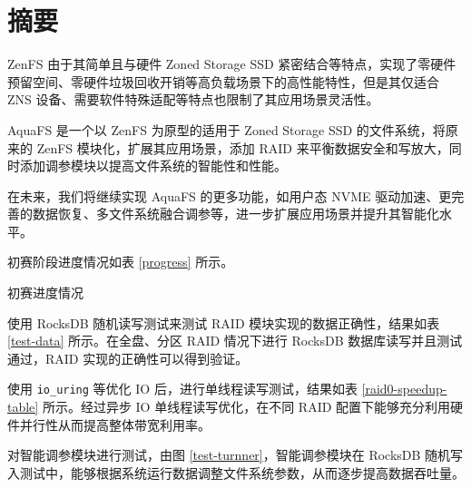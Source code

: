 \section*{摘要}

ZenFS 由于其简单且与硬件 Zoned Storage SSD 紧密结合等特点，实现了零硬件预留空间、零硬件垃圾回收开销等高负载场景下的高性能特性，但是其仅适合 ZNS 设备、需要软件特殊适配等特点也限制了其应用场景灵活性。

AquaFS 是一个以 ZenFS 为原型的适用于 Zoned Storage SSD 的文件系统，将原来的 ZenFS 模块化，扩展其应用场景，添加 RAID 来平衡数据安全和写放大，同时添加调参模块以提高文件系统的智能性和性能。

在未来，我们将继续实现 AquaFS 的更多功能，如用户态 NVME 驱动加速、更完善的数据恢复、多文件系统融合调参等，进一步扩展应用场景并提升其智能化水平。

初赛阶段进度情况如表 \ref{progress} 所示。

\begin{table}[htbp]
  \centering
  \caption{初赛进度情况}
  \label{progress}
  
\end{table}

使用 RocksDB 随机读写测试来测试 RAID 模块实现的数据正确性，结果如表 \ref{test-data} 所示。在全盘、分区 RAID 情况下进行 RocksDB 数据库读写并且测试通过，RAID 实现的正确性可以得到验证。

使用 \verb|io_uring| 等优化 IO 后，进行单线程读写测试，结果如表 \ref{raid0-speedup-table} 所示。经过异步 IO 单线程读写优化，在不同 RAID 配置下能够充分利用硬件并行性从而提高整体带宽利用率。

对智能调参模块进行测试，由图 \ref{test-turnner}，智能调参模块在 RocksDB 随机写入测试中，能够根据系统运行数据调整文件系统参数，从而逐步提高数据吞吐量。